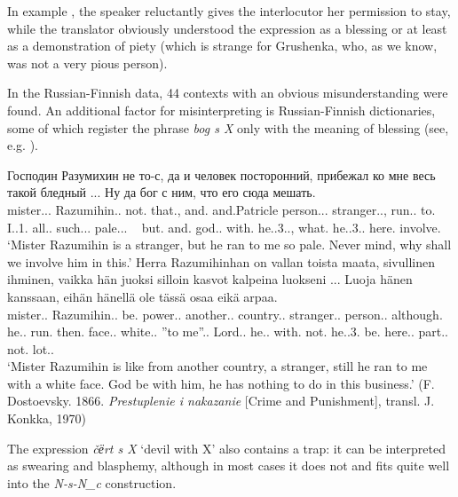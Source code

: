 \documentclass[output=paper]{langscibook}
\begin{document}
In example , the speaker reluctantly gives the interlocutor her permission to stay, while the translator obviously understood the expression as a blessing or at least as a demonstration of piety (which is strange for Grushenka, who, as we know, was not a very pious person).

In the Russian-Finnish data, 44 contexts with an obvious misunderstanding were found. An additional factor for misinterpreting is Russian-Finnish dictionaries, some of which register the phrase \textit{bog s X} only with the meaning of blessing (see, e.g. \citealt{KuusinenOllikainen1984}).

\ea
\gll Господин Разумихин не то-с, да и человек посторонний, прибежал ко мне весь такой бледный ... Ну да бог с ним, что его сюда мешать.\\
     mister.{\NOUN}.{\NOM}.{\SG} Razumihin.{\NOUNPROPER}.{\NOM} not.{\PTCP} that.{\PRON}, and.{\PTCP} and.Patricle person.{\NOUN}.{\NOM}.{\SG} stranger.{\ADJ}.{\NOM}{\glossM}{\SG}, run.{\PAST}.{\glossM}{\SG} to.{\PREP} I.{\PRON}.1.{\DAT} all.{\PRON}{\glossM}.{\NOM} such.{\ADJ}.{\NOM}.{\SG} pale.{\ADJ}.{\NOM}{\glossM}{\SG}. ~ but.{\PTCP} and.{\PTCP} god.{\NOUN}{\glossM}.{\NOM} with.{\PREP} he.{\PRON}.3.{\INSTR}.{\SG}, what.{\PRON} he.{\PRON}.3.{\ACC}.{\SG} here.{\ADV} involve.{\INF}\\
\glt `Mister Razumihin is a stranger, but he ran to me so pale. Never mind, why shall we involve him in this.'
\ex
\gll Herra Razumihinhan on vallan toista maata, sivullinen ihminen, vaikka hän juoksi silloin kasvot kalpeina luokseni ... Luoja hänen kanssaan, eihän hänellä ole tässä osaa eikä arpaa.\\
     mister.{\NOUN}.{\NOM} Razumihin.{\NOUN}.{\NOM} be.{\PRES} power.{\NOUN}.{\GEN} another.{\ADJ}.{\PART} country.{\NOUN}.{\PART} stranger.{\ADJ}.{\NOM} person.{\NOUN}.{\NOM} although.{\CONJ} he.{\PRON}.{\NOM} run.{\PAST} then.{\ADV} face.{\NOUN}.{\NOM} white.{\ADJ}.{\ESSIVE} ”to me”.{\ADV}. Lord.{\NOUN}.{\NOM} he.{\PRON}.{\GEN} with.{\POSTP} not.{\PTCP} he.{\PRON}.3.{\ALL} be.{\PRES} here.{\ADV}.{\ADESS} part.{\NOUN}.{\PART} not.{\PTCP} lot.{\NOUN}.{\PART}{\SG}\\
\glt `Mister Razumihin is like from another country, a stranger, still he ran to me with a white face. God be with him, he has nothing to do in this business.' (F. Dostoevsky. 1866. \textit{Prestuplenie i nakazanie} [Crime and Punishment], transl. J. Konkka, 1970)
\z

The expression \textit{č{ёrt s X}} ‘devil with X’ also contains a trap: it can be interpreted as swearing and blasphemy, although in most cases it does not and fits quite well into the \textit{N-s-N\_c} construction.
\end{document}

